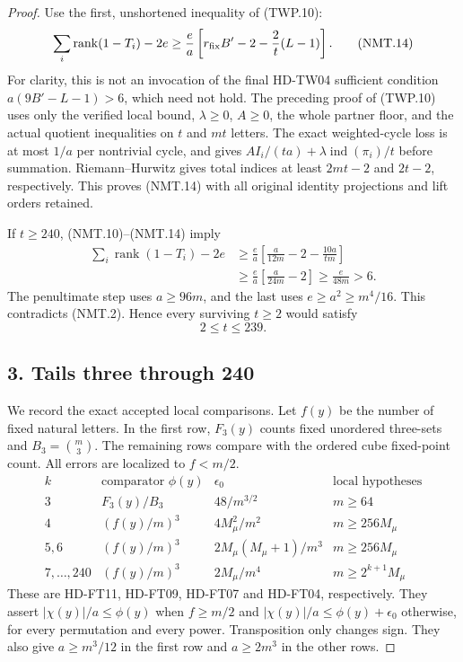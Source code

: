 \begin{proof}
Use the first, unshortened inequality of (TWP.10):
\[
 \sum_i\operatorname{rank}(1-T_i)-2e
 \ge\frac ea\left[r_{\rm fix}B'-2-\frac2t(L-1)\right].
 \tag{NMT.14}
\]
For clarity, this is not an invocation of the final HD-TW04
sufficient condition $a(9B'-L-1)>6$, which need not hold.
The preceding proof of (TWP.10) uses only the verified local
bound, $\lambda\ge0$, $A\ge0$, the whole partner floor,
and the actual quotient inequalities on $t$ and $mt$ letters.
The exact weighted-cycle loss is at most $1/a$ per nontrivial
cycle, and gives
$AI_i/(ta)+\lambda\operatorname{ind}(\pi_i)/t$ before summation.
Riemann--Hurwitz gives total indices at least $2mt-2$ and
$2t-2$, respectively.  This proves (NMT.14) with all original
identity projections and lift orders retained.

If $t\ge240$, (NMT.10)--(NMT.14) imply
\[
 \begin{split}
 \sum_i\operatorname{rank}(1-T_i)-2e
 &\ge\frac ea\left[\frac{a}{12m}-2-\frac{10a}{tm}\right]\\
 &\ge\frac ea\left[\frac{a}{24m}-2\right]
 \ge\frac{e}{48m}>6.
 \end{split}
 \tag{NMT.15}
\]
The penultimate step uses $a\ge96m$, and the last uses
$e\ge a^2\ge m^4/16$.
This contradicts (NMT.2).  Hence every surviving $t\ge2$
would satisfy
\[
                              2\le t\le239.
 \tag{NMT.16}
\]

\subsection*{3. Tails three through 240}

We record the exact accepted local comparisons.  Let $f(y)$
be the number of fixed natural letters.  In the first row,
$F_3(y)$ counts fixed unordered three-sets and
$B_3=\binom m3$.  The remaining rows compare with the ordered
cube fixed-point count.  All errors are localized to $f<m/2$.
\[
 \begin{array}{c|c|c|c}
 k&\text{comparator }\phi(y)&\epsilon_0&\text{local hypotheses}\\ \hline
 3&F_3(y)/B_3&48/m^{3/2}&m\ge64\\
 4&(f(y)/m)^3&4M_\mu^2/m^2&m\ge256M_\mu\\
 5,6&(f(y)/m)^3&2M_\mu(M_\mu+1)/m^3&m\ge256M_\mu\\
 7,\ldots,240&(f(y)/m)^3&2M_\mu/m^4&m\ge2^{k+1}M_\mu
 \end{array}
 \tag{NMT.17}
\]
These are HD-FT11, HD-FT09, HD-FT07 and HD-FT04, respectively.
They assert $|\chi(y)|/a\le\phi(y)$ when $f\ge m/2$ and
$|\chi(y)|/a\le\phi(y)+\epsilon_0$ otherwise, for every
permutation and every power.  Transposition only changes sign.
They also give $a\ge m^3/12$ in the first row and $a\ge2m^3$
in the other rows.


\end{proof}
